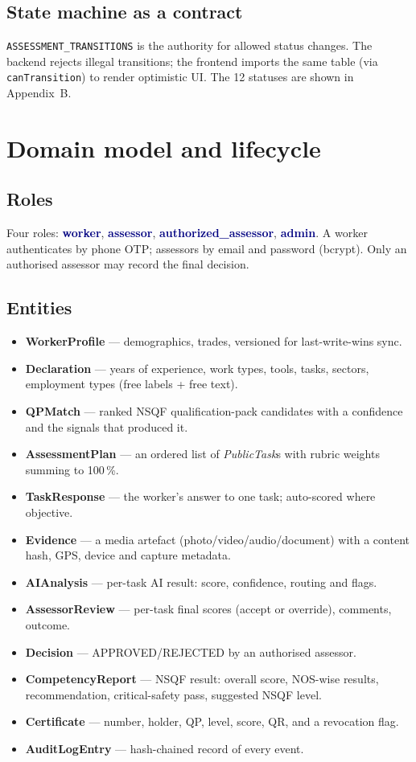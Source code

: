 \documentclass[11pt,a4paper]{article}
\newcommand{\code}[1]{\texttt{\small #1}}
\newcommand{\status}[1]{\textcolor{navy}{\textbf{#1}}}
\begin{document}
\subsection{State machine as a contract}
\code{ASSESSMENT_TRANSITIONS} is the authority for allowed status changes.
The backend rejects illegal transitions; the frontend imports the same table
(via \code{canTransition}) to render optimistic UI. The 12 statuses are shown
in Appendix~B.

\section{Domain model and lifecycle}
\subsection{Roles}
Four roles: \status{worker}, \status{assessor},
\status{authorized_assessor}, \status{admin}. A worker authenticates by phone
OTP; assessors by email and password (bcrypt). Only an authorised assessor may
record the final decision.

\subsection{Entities}
\begin{itemize}
\item \textbf{WorkerProfile} --- demographics, trades, versioned for
      last-write-wins sync.
\item \textbf{Declaration} --- years of experience, work types, tools, tasks,
      sectors, employment types (free labels + free text).
\item \textbf{QPMatch} --- ranked NSQF qualification-pack candidates with a
      confidence and the signals that produced it.
\item \textbf{AssessmentPlan} --- an ordered list of \emph{PublicTask}s with
      rubric weights summing to 100\,\%.
\item \textbf{TaskResponse} --- the worker's answer to one task; auto-scored
      where objective.
\item \textbf{Evidence} --- a media artefact (photo/video/audio/document)
      with a content hash, GPS, device and capture metadata.
\item \textbf{AIAnalysis} --- per-task AI result: score, confidence, routing
      and flags.
\item \textbf{AssessorReview} --- per-task final scores (accept or override),
      comments, outcome.
\item \textbf{Decision} --- APPROVED/REJECTED by an authorised assessor.
\item \textbf{CompetencyReport} --- NSQF result: overall score, NOS-wise
      results, recommendation, critical-safety pass, suggested NSQF level.
\item \textbf{Certificate} --- number, holder, QP, level, score, QR, and a
      revocation flag.
\item \textbf{AuditLogEntry} --- hash-chained record of every event.
\end{itemize}
\end{document}
